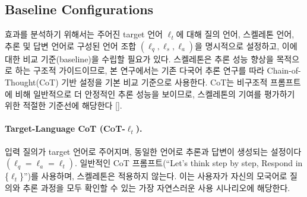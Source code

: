 


\subsection{Baseline Configurations}

 효과를 분석하기 위해서는 주어진 target 언어 $\ell_t$에 대해 질의 언어, 스켈레톤 언어, 추론 및 답변 언어로 구성된 언어 조합 $(\ell_q,\ell_s,\ell_a)$을 명시적으로 설정하고, 이에 대한 비교 기준(baseline)을 수립할 필요가 있다. 스켈레톤은 추론 성능 향상을 목적으로 하는 구조적 가이드이므로, 본 연구에서는 기존 다국어 추론 연구를 따라 Chain-of-Thought(CoT) 기반 설정을 기본 비교 기준으로 사용한다. CoT는 비구조적 프롬프트에 비해 일반적으로 더 안정적인 추론 성능을 보이므로, 스켈레톤의 기여를 평가하기 위한 적절한 기준선에 해당한다 [].

\paragraph{Target-Language CoT (\textsc{CoT-$\ell_t$}).}
입력 질의가 target 언어로 주어지며, 동일한 언어로 추론과 답변이 생성되는 설정이다 $(\ell_q=\ell_a=\ell_t)$. 일반적인 CoT 프롬프트(``Let’s think step by step, Respond in \{$\ell_t$\}'')를 사용하며, 스켈레톤은 적용하지 않는다. 이는 사용자가 자신의 모국어로 질의와 추론 과정을 모두 확인할 수 있는 가장 자연스러운 사용 시나리오에 해당한다.

